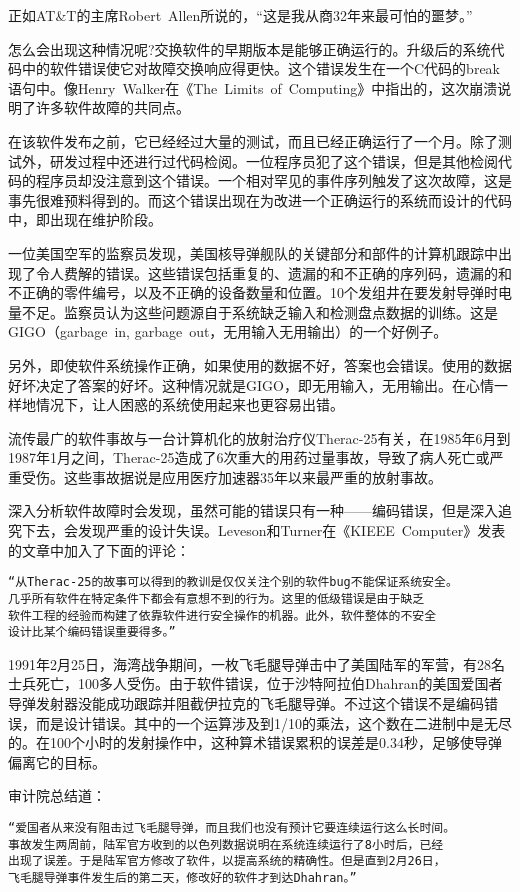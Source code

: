 正如AT\&T的主席Robert~Allen所说的，“这是我从商32年来最可怕的噩梦。”

怎么会出现这种情况呢?交换软件的早期版本是能够正确运行的。升级后的系统代码中的软件错误使它对故障交换响应得更快。这个错误发生在一个C代码的break语句中。像Henry~Walker在《The~Limits~of~Computing》中指出的，这次崩溃说明了许多软件故障的共同点。

在该软件发布之前，它已经经过大量的测试，而且已经正确运行了一个月。除了测试外，研发过程中还进行过代码检阅。一位程序员犯了这个错误，但是其他检阅代码的程序员却没注意到这个错误。一个相对罕见的事件序列触发了这次故障，这是事先很难预料得到的。而这个错误出现在为改进一个正确运行的系统而设计的代码中，即出现在维护阶段。

一位美国空军的监察员发现，美国核导弹舰队的关键部分和部件的计算机跟踪中出现了令人费解的错误。这些错误包括重复的、遗漏的和不正确的序列码，遗漏的和不正确的零件编号，以及不正确的设备数量和位置。10个发组井在要发射导弹时电量不足。监察员认为这些问题源自于系统缺乏输入和检测盘点数据的训练。这是GIGO（garbage~in, garbage~out，无用输入无用输出）的一个好例子。

另外，即使软件系统操作正确，如果使用的数据不好，答案也会错误。使用的数据好坏决定了答案的好坏。这种情况就是GIGO，即无用输入，无用输出。在心情一样地情况下，让人困惑的系统使用起来也更容易出错。

流传最广的软件事故与一台计算机化的放射治疗仪Therac-25有关，在1985年6月到1987年1月之间，Therac-25造成了6次重大的用药过量事故，导致了病人死亡或严重受伤。这些事故据说是应用医疗加速器35年以来最严重的放射事故。

深入分析软件故障时会发现，虽然可能的错误只有一种——编码错误，但是深入追究下去，会发现严重的设计失误。Leveson和Turner在《KIEEE~Computer》发表的文章中加入了下面的评论：
\begin{verbatim}
“从Therac-25的故事可以得到的教训是仅仅关注个别的软件bug不能保证系统安全。
几乎所有软件在特定条件下都会有意想不到的行为。这里的低级错误是由于缺乏
软件工程的经验而构建了依靠软件进行安全操作的机器。此外，软件整体的不安全
设计比某个编码错误重要得多。”
\end{verbatim}

1991年2月25日，海湾战争期间，一枚飞毛腿导弹击中了美国陆军的军营，有28名士兵死亡，100多人受伤。由于软件错误，位于沙特阿拉伯Dhahran的美国爱国者导弹发射器没能成功跟踪并阻截伊拉克的飞毛腿导弹。不过这个错误不是编码错误，而是设计错误。其中的一个运算涉及到1/10的乘法，这个数在二进制中是无尽的。在100个小时的发射操作中，这种算术错误累积的误差是0.34秒，足够使导弹偏离它的目标。

审计院总结道：
\begin{verbatim}
“爱国者从来没有阻击过飞毛腿导弹，而且我们也没有预计它要连续运行这么长时间。
事故发生两周前，陆军官方收到的以色列数据说明在系统连续运行了8小时后，已经
出现了误差。于是陆军官方修改了软件，以提高系统的精确性。但是直到2月26日，
飞毛腿导弹事件发生后的第二天，修改好的软件才到达Dhahran。”
\end{verbatim}

